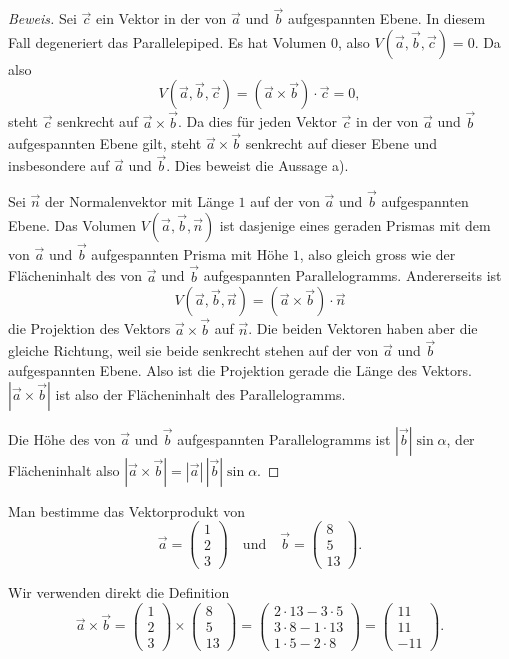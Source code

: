\begin{proof}[Beweis]
Sei $\vec c$ ein Vektor in der von $\vec a$ und $\vec b$ aufgespannten
Ebene.
In diesem Fall degeneriert das Parallelepiped.
Es hat Volumen $0$,
also $V(\vec a,\vec b,\vec c)= 0$.
Da also
\[
V(\vec a,\vec b,\vec c)=(\vec a\times \vec b)\cdot \vec c=0,
\]
steht $\vec c$ senkrecht auf $\vec a\times\vec b$.
Da dies für jeden
Vektor $\vec c$ in der von $\vec a$ und $\vec b$ aufgespannten Ebene
gilt, steht $\vec a\times\vec b$ senkrecht auf dieser Ebene und insbesondere
auf $\vec a$ und $\vec b$.
Dies beweist die Aussage a).

Sei $\vec n$ der Normalenvektor mit Länge $1$ auf der von $\vec a$ und
$\vec b$ aufgespannten Ebene.
Das Volumen $V(\vec a,\vec b,\vec n)$ ist
dasjenige eines geraden Prismas mit dem von $\vec a$ und $\vec b$
aufgespannten Prisma mit Höhe $1$, also gleich gross wie der
Flächeninhalt des von $\vec a$ und $\vec b$ aufgespannten Parallelogramms.
Andererseits ist
\[
V(\vec a,\vec b,\vec n)=(\vec a\times\vec b)\cdot \vec n
\]
die Projektion des Vektors $\vec a\times\vec b$ auf $\vec n$.
Die beiden
Vektoren haben aber die gleiche Richtung, weil sie beide senkrecht stehen
auf der von $\vec a$ und $\vec b$ aufgespannten Ebene.
Also ist die Projektion
gerade die Länge des Vektors.
$|\vec a\times\vec b|$ ist also der Flächeninhalt des Parallelogramms.

Die Höhe des von $\vec a$ und $\vec b$ aufgespannten Parallelogramms
ist $|\vec b|\sin \alpha$, der Flächeninhalt also
$|\vec a\times\vec b|=|\vec a|\,|\vec b|\sin\alpha.$
\end{proof}

\begin{beispiel}
Man bestimme das Vektorprodukt von
\[
\vec a=\begin{pmatrix}1\\2\\3\end{pmatrix}
\quad\text{und}\quad
\vec b=\begin{pmatrix}8\\5\\13\end{pmatrix}.
\]

\smallskip
{\parindent 0pt Wir verwenden direkt die Definition}
\[
\vec a\times \vec b=
\begin{pmatrix}1\\2\\3\end{pmatrix}
\times
\begin{pmatrix}8\\5\\13\end{pmatrix}
=
\begin{pmatrix}
2\cdot 13-3\cdot 5\\
3\cdot 8-1\cdot 13\\
1\cdot 5-2\cdot 8
\end{pmatrix}
=
\begin{pmatrix}
11\\
11\\
-11
\end{pmatrix}.
\]
\end{beispiel}

